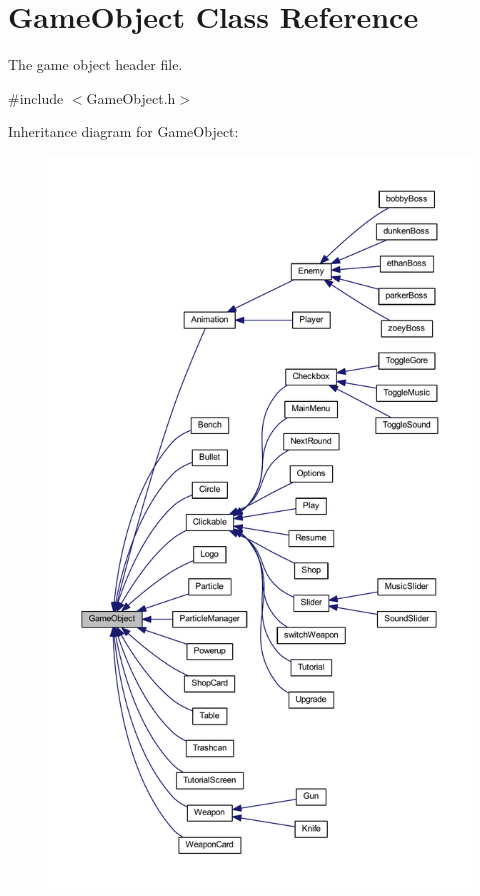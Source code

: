 \hypertarget{class_game_object}{\section{Game\+Object Class Reference}
\label{class_game_object}
}


The game object header file.  




{\ttfamily \#include $<$Game\+Object.\+h$>$}



Inheritance diagram for Game\+Object\+:\nopagebreak
\begin{figure}[H]
\begin{center}
\leavevmode
\includegraphics[height=550pt]{class_game_object__inherit__graph}
\end{center}
\end{figure}

